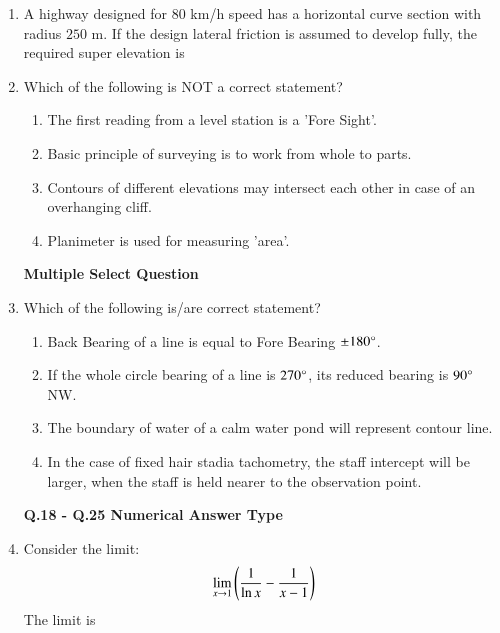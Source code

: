 \documentclass[journal,12pt,onecolumn]{article}
\theoremstyle{remark}
\begin{document}
\begin{enumerate}
\item A highway designed for $80$ km/h speed has a horizontal curve section with radius $250$ m. If the design lateral friction is assumed to develop fully, the required super elevation is

\hfill{}
\begin{enumerate}
\end{enumerate}

\item Which of the following is NOT a correct statement?
\hfill{}
\begin{enumerate}
    \item The first reading from a level station is a 'Fore Sight'.
    \item Basic principle of surveying is to work from whole to parts.
    \item Contours of different elevations may intersect each other in case of an overhanging cliff.
    \item Planimeter is used for measuring 'area'.
\end{enumerate}

\textbf{Multiple Select Question}

\item Which of the following is/are correct statement?
\hfill{}
\begin{enumerate}
    \item Back Bearing of a line is equal to Fore Bearing $\pm 180\degree$.
    \item If the whole circle bearing of a line is $270\degree$, its reduced bearing is $90\degree$ NW.
    \item The boundary of water of a calm water pond will represent contour line.
    \item In the case of fixed hair stadia tachometry, the staff intercept will be larger, when the staff is held nearer to the observation point.
\end{enumerate}

\textbf{Q.18 - Q.25 Numerical Answer Type}

\item Consider the limit:
\begin{align}
\lim_{x \to 1} \left(\frac{1}{\ln x} - \frac{1}{x-1}\right)
\end{align}
The limit  is \underline{\hspace{2cm}}


\end{enumerate}
\end{document}

